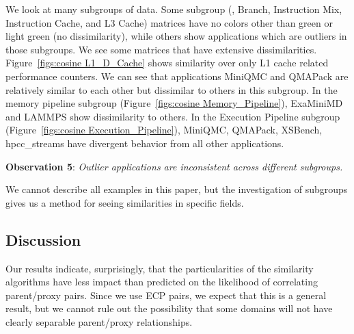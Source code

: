 We look at many subgroups of data. Some subgroup (\eg, Branch, Instruction Mix, Instruction Cache, and L3 Cache) matrices have no colors other than green or light green (no dissimilarity), while others show applications which are outliers in those subgroups. We see some matrices that have extensive dissimilarities. Figure~\ref{figs:cosine L1_D_Cache} shows similarity over only L1 cache related performance counters. We can see that applications MiniQMC and QMAPack are relatively
similar to each other but dissimilar to others in this subgroup. In the memory pipeline subgroup (Figure~\ref{figs:cosine Memory_Pipeline}), ExaMiniMD and LAMMPS show dissimilarity to others. In the Execution Pipeline subgroup (Figure~\ref{figs:cosine Execution_Pipeline}), MiniQMC, QMAPack, XSBench, hpcc\_streams have divergent behavior from all other applications.  \begin{mdframed}\textbf{Observation 5}: \textit{Outlier applications are inconsistent across different subgroups.}\end{mdframed}
We cannot describe all examples in this paper, but the investigation of subgroups gives us a method for seeing similarities in specific fields.%



\subsection{Discussion}
Our results indicate, surprisingly, that the particularities of the similarity algorithms have less impact than predicted on the likelihood of correlating parent/proxy pairs.  Since we use ECP pairs, we expect that this is a general result, but we cannot rule out the possibility that some domains will not have clearly separable parent/proxy relationships.

